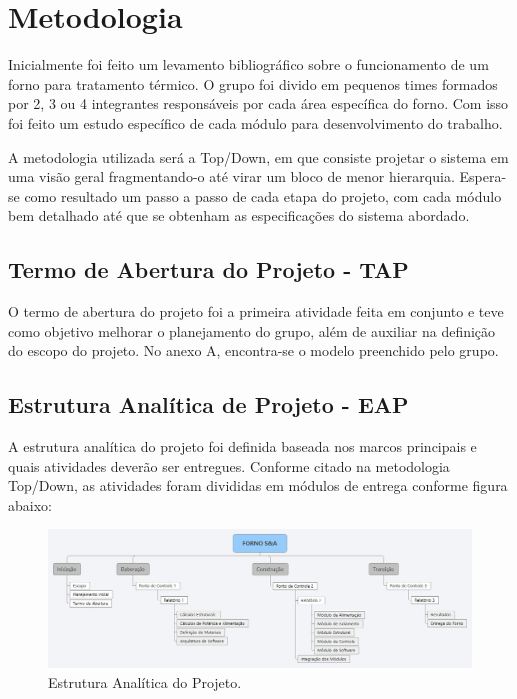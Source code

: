 \chapter[Metodologia]{Metodologia}

Inicialmente foi feito um levamento bibliográfico sobre o funcionamento de um forno para tratamento térmico. O grupo foi divido em pequenos times formados por 2, 3 ou 4 integrantes responsáveis por cada área específica do forno. Com isso foi feito um estudo específico de cada módulo para desenvolvimento do trabalho.

A metodologia utilizada será a Top/Down, em que consiste projetar o sistema em uma visão geral fragmentando-o até virar um bloco de menor hierarquia. Espera-se como resultado um passo a passo de cada etapa do projeto, com cada módulo bem detalhado até que se obtenham as especificações do sistema abordado.


\section{Termo de Abertura do Projeto - TAP}

O termo de abertura do projeto foi a primeira atividade feita em conjunto e teve como objetivo melhorar o planejamento do grupo, além de auxiliar na definição do escopo do projeto. No anexo A, encontra-se o modelo preenchido pelo grupo.

\section{Estrutura Analítica de Projeto - EAP}

A estrutura analítica do projeto foi definida baseada nos marcos principais e quais atividades deverão ser entregues. Conforme citado na metodologia Top/Down, as atividades foram divididas em módulos de entrega conforme figura abaixo:

\begin{figure}[!ht]
	\centering
	\label{eap}
	\includegraphics[keepaspectratio=true,scale=0.3]{figuras/eap.jpg}
	\caption{Estrutura Analítica do Projeto.}
\end{figure}

